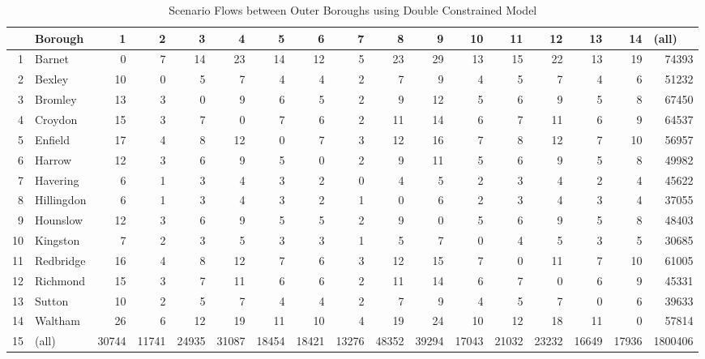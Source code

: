 \documentclass[11pt]{article} %
\begin{document}
\begin{table}
\footnotesize
\caption{Scenario Flows between Outer Boroughs using Double Constrained Model}
\begin{tabular}{|r|l|r|r|r|r|r|r|r|r|r|r|r|r|r|r|r|}
\hline
\multicolumn{1}{|l|}{} & Borough & 1 & 2 & 3 & 4 & 5 & 6 & 7 & 8 & 9 & 10 & 11 & 12 & 13 & 14 & \multicolumn{1}{l|}{(all)} \\ \hline
1 & Barnet & 0 & 7 & 14 & 23 & 14 & 12 & 5 & 23 & 29 & 13 & 15 & 22 & 13 & 19 & 74393 \\ \hline
2 & Bexley & 10 & 0 & 5 & 7 & 4 & 4 & 2 & 7 & 9 & 4 & 5 & 7 & 4 & 6 & 51232 \\ \hline
3 & Bromley & 13 & 3 & 0 & 9 & 6 & 5 & 2 & 9 & 12 & 5 & 6 & 9 & 5 & 8 & 67450 \\ \hline
4 & Croydon & 15 & 3 & 7 & 0 & 7 & 6 & 2 & 11 & 14 & 6 & 7 & 11 & 6 & 9 & 64537 \\ \hline
5 & Enfield & 17 & 4 & 8 & 12 & 0 & 7 & 3 & 12 & 16 & 7 & 8 & 12 & 7 & 10 & 56957 \\ \hline
6 & Harrow & 12 & 3 & 6 & 9 & 5 & 0 & 2 & 9 & 11 & 5 & 6 & 9 & 5 & 8 & 49982 \\ \hline
7 & Havering & 6 & 1 & 3 & 4 & 3 & 2 & 0 & 4 & 5 & 2 & 3 & 4 & 2 & 4 & 45622 \\ \hline
8 & Hillingdon & 6 & 1 & 3 & 4 & 3 & 2 & 1 & 0 & 6 & 2 & 3 & 4 & 3 & 4 & 37055 \\ \hline
9 & Hounslow & 12 & 3 & 6 & 9 & 5 & 5 & 2 & 9 & 0 & 5 & 6 & 9 & 5 & 8 & 48403 \\ \hline
10 & Kingston & 7 & 2 & 3 & 5 & 3 & 3 & 1 & 5 & 7 & 0 & 4 & 5 & 3 & 5 & 30685 \\ \hline
11 & Redbridge & 16 & 4 & 8 & 12 & 7 & 6 & 3 & 12 & 15 & 7 & 0 & 11 & 7 & 10 & 61005 \\ \hline
12 & Richmond & 15 & 3 & 7 & 11 & 6 & 6 & 2 & 11 & 14 & 6 & 7 & 0 & 6 & 9 & 45331 \\ \hline
13 & Sutton & 10 & 2 & 5 & 7 & 4 & 4 & 2 & 7 & 9 & 4 & 5 & 7 & 0 & 6 & 39633 \\ \hline
14 & Waltham & 26 & 6 & 12 & 19 & 11 & 10 & 4 & 19 & 24 & 10 & 12 & 18 & 11 & 0 & 57814 \\ \hline
15 & (all) & 30744 & 11741 & 24935 & 31087 & 18454 & 18421 & 13276 & 48352 & 39294 & 17043 & 21032 & 23232 & 16649 & 17936 & 1800406 \\ \hline
\end{tabular}
\label{Estimated Flows Double}
\end{table}
\end{document}
